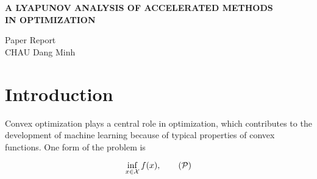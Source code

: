 \begin{center}
    \textbf{\Large A LYAPUNOV ANALYSIS OF ACCELERATED METHODS \\ IN OPTIMIZATION} \\
    \vspace{0.5cm}

    Paper Report \\
    CHAU Dang Minh
\end{center}


\section{Introduction}
Convex optimization plays a central role in optimization, which contributes to the development of machine learning because of typical properties of convex functions. One form of the problem is

\begin{equation}
    \inf\limits_{x\in\X} f(x),
    \tag{$\P$}
\end{equation}

